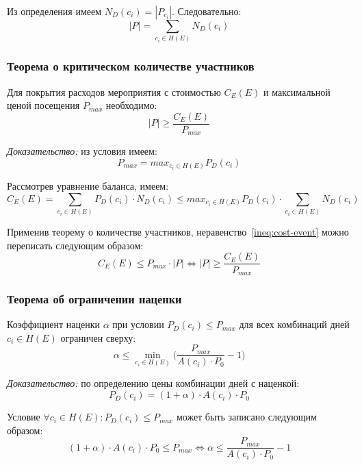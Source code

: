 Из определения имеем $N_D(c_i) = |P_{c_i}|$. Следовательно:
\begin{equation}
	|P| = \sum_{c_i \in H(E)}{N_D(c_i)}
\end{equation}

\subsubsection{Теорема о критическом количестве участников}

Для покрытия расходов мероприятия с стоимостью $C_E(E)$ и максимальной ценой посещения $P_{max}$ необходимо:
\begin{equation}
	|P| \ge \frac{C_E(E)}{P_{max}}
\end{equation}

\textit{Доказательство:} из условия имеем:
\begin{equation}
	P_{max} = max_{c_i \in H(E)}{P_D(c_i)}
\end{equation}

Рассмотрев уравнение баланса, имеем:
\begin{equation}
	C_E(E) = \sum_{c_i \in H(E)}{P_D(c_i) \cdot N_D(c_i)} \le max_{c_i \in H(E)}{P_D(c_i)} \cdot \sum_{c_i \in H(E)}{N_D(c_i)}
	\label{ineq:cost-event}
\end{equation}

Применив теорему о количестве участников, неравенство~\ref{ineq:cost-event} можно переписать следующим образом:
\begin{equation}
	C_E(E) \le P_{max} \cdot |P| \Leftrightarrow |P| \ge \frac{C_E(E)}{P_{max}}
\end{equation}

\subsubsection{Теорема об ограничении наценки}

Коэффициент наценки $\alpha$ при условии $P_D(c_i) \le P_{max}$ для всех комбинаций дней $c_i \in H(E)$ ограничен сверху:
\begin{equation}
	\alpha \le \min_{c_i \in H(E)}{\Big(\frac{P_{max}}{A(c_i) \cdot P_0} - 1\Big)}
\end{equation}

\textit{Доказательство:} по определению цены комбинации дней с наценкой:
\begin{equation}
	P_D(c_i) = (1 + \alpha) \cdot A(c_i) \cdot P_0
\end{equation}

Условие $\forall c_i \in H(E): P_D(c_i) \le P_{max}$ может быть записано следующим образом:
\begin{equation}
	(1 + \alpha) \cdot A(c_i) \cdot P_0 \le P_{max} \Leftrightarrow \alpha \le \frac{P_{max}}{A(c_i) \cdot P_0} - 1
\end{equation}

